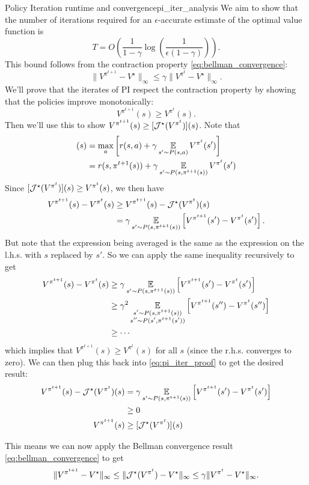 \documentclass[../main/main]{subfiles}
\begin{document}
\begin{theorem}{Policy Iteration runtime and convergence}{pi_iter_analysis}
We aim to show that the number of iterations required for an $\epsilon$-accurate estimate of the optimal value function is
\[
    T = O\left( \frac{1}{1-\gamma} \log\left(\frac{1}{\epsilon (1-\gamma)}\right) \right).
\]
This bound follows from the contraction property \eqref{eq:bellman_convergence}:
\[
    \|V^{\pi^{t+1}} - V^\star \|_{\infty} \le \gamma \|V^{\pi^{t}} - V^\star \|_{\infty}.
\]
We'll prove that the iterates of PI respect the contraction property by showing that the policies improve monotonically:
\[
    V^{\pi^{t+1}}(s) \ge V^{\pi^{t}}(s).
\]
Then we'll use this to show $V^{\pi^{t+1}}(s) \ge [\mathcal{J}^{\star}(V^{\pi^{t}})](s)$. Note that
\begin{align*}
    [\bop^{\star} (V^{\pi^{t}})](s) &= \max_a \left[ r(s, a) + \gamma \E_{s' \sim P(s, a)} V^{\pi^{t}}(s') \right] \\
    &= r(s, \pi^{t+1}(s)) + \gamma \E_{s' \sim P(s, \pi^{t+1}(s))} V^{\pi^{t}}(s')
\end{align*}
Since $[\mathcal{J}^{\star}(V^{\pi^{t}})](s) \ge V^{\pi^{t}}(s)$, we then have
\begin{equation}
    \begin{aligned}
        V^{\pi^{t+1}}(s) - V^{\pi^{t}}(s) &\ge V^{\pi^{t+1}}(s) - \mathcal{J}^{\star} (V^{\pi^{t}})(s) \\
        &= \gamma \operatorname*{\mathbb{E}}_{s' \sim P(s, \pi^{t+1}(s))} \left[V^{\pi^{t+1}}(s') -  V^{\pi^{t}}(s') \right].
    \end{aligned} \label{eq:pi_iter_proof}
\end{equation}
But note that the expression being averaged is the same as the expression on the l.h.s. with $s$ replaced by $s'$. So we can apply the same inequality recursively to get
\begin{align*}
    V^{\pi^{t+1}}(s) - V^{\pi^{t}}(s) &\ge  \gamma \operatorname*{\mathbb{E}}_{s' \sim P(s, \pi^{t+1}(s))} \left[V^{\pi^{t+1}}(s') -  V^{\pi^{t}}(s') \right] \\
    &\ge \gamma^2 \operatorname*{\mathbb{E}}_{\substack{s' \sim P(s, \pi^{t+1}(s)) \\ s'' \sim P(s', \pi^{t+1}(s'))}} \left[V^{\pi^{t+1}}(s'') -  V^{\pi^{t}}(s'') \right]\\
    &\ge \cdots
\end{align*}
which implies that $V^{\pi^{t+1}}(s) \ge V^{\pi^{t}}(s)$ for all $s$ (since the r.h.s. converges to zero). We can then plug this back into \eqref{eq:pi_iter_proof} to get the desired result:
\begin{align*}
    V^{\pi^{t+1}}(s) - \mathcal{J}^{\star} (V^{\pi^{t}})(s) &= \gamma \operatorname*{\mathbb{E}}_{s' \sim P(s, \pi^{t+1}(s))} \left[V^{\pi^{t+1}}(s') -  V^{\pi^{t}}(s') \right] \\
    &\ge 0 \\
    V^{\pi^{t+1}}(s) &\ge [\mathcal{J}^{\star}(V^{\pi^{t}})](s)
\end{align*}

This means we can now apply the Bellman convergence result \eqref{eq:bellman_convergence} to get
\[
    \|V^{\pi^{t+1}} - V^\star \|_{\infty} \le \|\mathcal{J}^{\star} (V^{\pi^{t}}) - V^{\star}\|_{\infty} \le \gamma \|V^{\pi^{t}} - V^\star \|_{\infty}.
\]
\end{theorem}
\end{document}
